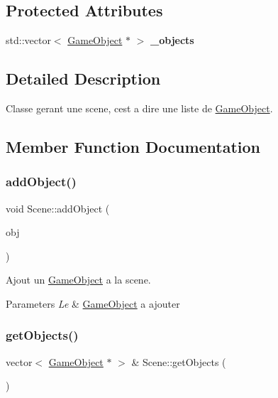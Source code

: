 \subsection*{Protected Attributes}
\begin{DoxyCompactItemize}
\item 
\hypertarget{class_scene_a08d7cc1bd05adcaedf8d264c8b9a3da2}{}\label{class_scene_a08d7cc1bd05adcaedf8d264c8b9a3da2} 
std\+::vector$<$ \hyperlink{class_game_object}{Game\+Object} $\ast$ $>$ {\bfseries \+\_\+objects}
\end{DoxyCompactItemize}


\subsection{Detailed Description}
Classe gerant une scene, c\textquotesingle{}est a dire une liste de \hyperlink{class_game_object}{Game\+Object}. 

\subsection{Member Function Documentation}
\hypertarget{class_scene_aed7c3cfbef1cfa439af13e56dfd5a07c}{}\label{class_scene_aed7c3cfbef1cfa439af13e56dfd5a07c} 
\subsubsection{\texorpdfstring{add\+Object()}{addObject()}}
{\footnotesize\ttfamily void Scene\+::add\+Object (\begin{DoxyParamCaption}\item[{\hyperlink{class_game_object}{Game\+Object} $\ast$}]{obj }\end{DoxyParamCaption})}



Ajout un \hyperlink{class_game_object}{Game\+Object} a la scene. 


\begin{DoxyParams}{Parameters}
{\em Le} & \hyperlink{class_game_object}{Game\+Object} a ajouter \\
\hline
\end{DoxyParams}
\hypertarget{class_scene_a9e7d39e9d4b1d6b76997e1453738658d}{}\label{class_scene_a9e7d39e9d4b1d6b76997e1453738658d} 
\subsubsection{\texorpdfstring{get\+Objects()}{getObjects()}}
{\footnotesize\ttfamily vector$<$ \hyperlink{class_game_object}{Game\+Object} $\ast$ $>$ \& Scene\+::get\+Objects (\begin{DoxyParamCaption}{ }\end{DoxyParamCaption})}



